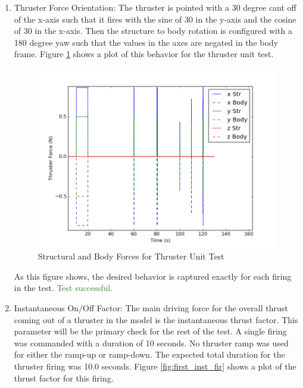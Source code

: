 \documentclass[]{LASPreport}
\begin{document}
{\begin{enumerate}
\item{Thruster Force Orientation: The thruster is pointed with a 30 degree cant 
    off of the x-axis such that it fires with the sine of 30 in the y-axis 
    and the cosine of 30 in the x-axis.  Then the structure to body rotation 
    is configured with a 180 degree yaw such that the values in the axes are 
    negated in the body frame. Figure \ref{fig:force_vec_fig} shows a plot of 
    this behavior for the thruster unit test.
    \begin{figure}[htb]
            \centerline{
            \includegraphics[scale=0.5]{Figures/thrusterForceData}
            }
            \caption{Structural and Body Forces for Thruster Unit Test}
            \label{fig:force_vec_fig}
    \end{figure}
    As this figure shows, the desired behavior is captured exactly for each 
    firing in the test.  \textcolor{ForestGreen}{Test successful.}
}
\item{Instantaneous On/Off Factor:  The main driving force for the overall 
    thrust coming out of a thruster in the model is the instantaneous thrust 
    factor.  This parameter will be the primary check for the rest of the test. 
    A single firing was commanded with a duration of 10 seconds.  No thruster 
    ramp was used for either the ramp-up or ramp-down.  The expected total 
    duration for the thruster firing was 10.0 seconds.  Figure 
    \ref{fig:first_inst_fir} shows a plot of the thrust factor for this firing.
    \begin{figure}[htb]
            \centerline{
}
\end{figure}}
\end{enumerate}}
\end{document}
